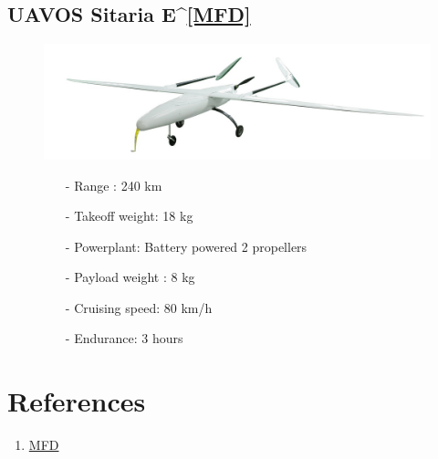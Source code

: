 \documentclass{article}
\begin{document}
\subsection{UAVOS Sitaria E^{\ref{MFD}}}
\begin{figure}[h]
    \begin{minipage}[b]{.45\linewidth}
        \centering
        \includegraphics[width=0.7\linewidth]{Aircraft pics/UAVOS SITARIA E.png}
    \end{minipage}\hfill
    \begin{minipage}[b]{0.45\linewidth}
        \begin{itemize}
            \item [-] Range : 240 km
            \item [-] Takeoff weight: 18 kg
            \item [-] Powerplant: Battery powered 2 propellers
            \item [-] Payload weight : 8 kg
            \item [-] Cruising speed: 80 km/h 
            \item [-] Endurance: 3 hours
        \end{itemize}
    \end{minipage}
\end{figure}



\vspace{\fill}

\section{References}
\begin{enumerate}
    \item \label{MFD} \href{https://www.uavmodel.com/collections/fixed-wing/products/mfd-crosswind-nimbus-pro-v2-binary-1900mm-uav-fixed-wing}{MFD}
\end{enumerate}
\end{document}
